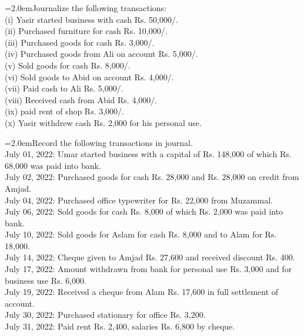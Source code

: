 \documentclass[11pt,a4paper]{article}
\newcommand{\lqn}[2]{\Needspace{6\baselineskip}\par\medskip\noindent\hangindent=2.0em\hangafter=1\makebox[2.0em][l]{\textbf{#1.}}#2\par}
\begin{document}
\lqn{21}{Journalize the following transactions:\\
(i) Yasir started business with cash Rs. 50,000/.\\
(ii) Purchased furniture for cash Rs. 10,000/.\\
(iii) Purchased goods for cash Rs. 3,000/.\\
(iv) Purchased goods from Ali on account Rs. 5,000/.\\
(v) Sold goods for cash Rs. 8,000/.\\
(vi) Sold goods to Abid on account Rs. 4,000/.\\
(vii) Paid cash to Ali Rs. 5,000/.\\
(viii) Received cash from Abid Rs. 4,000/.\\
(ix) paid rent of shop Rs. 3,000/.\\
(x) Yasir withdrew cash Rs. 2,000 for his personal use.\par
}
\lqn{22}{Record the following transactions in journal.\\
July 01, 2022:    Umar started business with a capital of Rs. 148,000 of which Rs. 68,000 was paid into bank.\\
July 02, 2022:    Purchased goods for cash Rs. 28,000 and Rs. 28,000 on credit from Amjad.\\
July 04, 2022:    Purchased office typewriter for Rs. 22,000 from Muzammal.\\
July 06, 2022:    Sold goods for cash Rs. 8,000 of which Rs. 2,000 was paid into bank.\\
July 10, 2022:    Sold goods for Aslam for cash Rs. 8,000 and to Alam for Rs. 18,000.\\
July 14, 2022:    Cheque given to Amjad Rs. 27,600 and received discount Rs. 400.\\
July 17, 2022:    Amount withdrawn from bank for personal use Rs. 3,000 and for business use Rs. 6,000.\\
July 19, 2022:    Received a cheque from Alam Rs. 17,600 in full settlement of account.\\
July 30, 2022:    Purchased stationary for office Rs. 3,200.\\
July 31, 2022:    Paid rent Rs. 2,400, salaries Rs. 6,800 by cheque.\par
}
\end{document}
